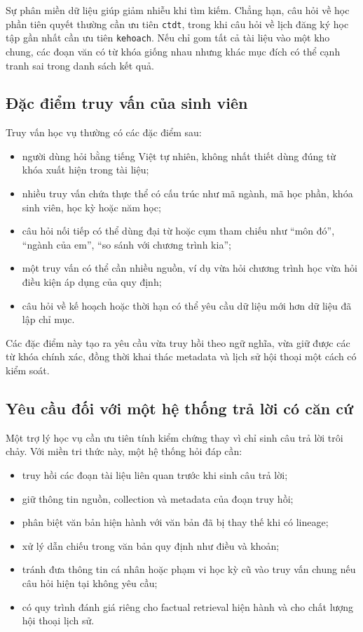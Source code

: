\documentclass[../DoAn.tex]{subfiles}
\begin{document}
Sự phân miền dữ liệu giúp giảm nhiễu khi tìm kiếm. Chẳng hạn, câu hỏi về học phần
tiên quyết thường cần ưu tiên \texttt{ctdt}, trong khi câu hỏi về lịch đăng ký
học tập gần nhất cần ưu tiên \texttt{kehoach}. Nếu chỉ gom tất cả tài liệu vào
một kho chung, các đoạn văn có từ khóa giống nhau nhưng khác mục đích có thể cạnh
tranh sai trong danh sách kết quả.

\subsection{Đặc điểm truy vấn của sinh viên}

Truy vấn học vụ thường có các đặc điểm sau:

\begin{itemize}
    \item người dùng hỏi bằng tiếng Việt tự nhiên, không nhất thiết dùng đúng từ
    khóa xuất hiện trong tài liệu;
    \item nhiều truy vấn chứa thực thể có cấu trúc như mã ngành, mã học phần,
    khóa sinh viên, học kỳ hoặc năm học;
    \item câu hỏi nối tiếp có thể dùng đại từ hoặc cụm tham chiếu như ``môn đó'',
    ``ngành của em'', ``so sánh với chương trình kia'';
    \item một truy vấn có thể cần nhiều nguồn, ví dụ vừa hỏi chương trình học vừa
    hỏi điều kiện áp dụng của quy định;
    \item câu hỏi về kế hoạch hoặc thời hạn có thể yêu cầu dữ liệu mới hơn dữ liệu
    đã lập chỉ mục.
\end{itemize}

Các đặc điểm này tạo ra yêu cầu vừa truy hồi theo ngữ nghĩa, vừa giữ được các từ
khóa chính xác, đồng thời khai thác metadata và lịch sử hội thoại một cách có
kiểm soát.

\subsection{Yêu cầu đối với một hệ thống trả lời có căn cứ}

Một trợ lý học vụ cần ưu tiên tính kiểm chứng thay vì chỉ sinh câu trả lời trôi
chảy. Với miền tri thức này, một hệ thống hỏi đáp cần:

\begin{itemize}
    \item truy hồi các đoạn tài liệu liên quan trước khi sinh câu trả lời;
    \item giữ thông tin nguồn, collection và metadata của đoạn truy hồi;
    \item phân biệt văn bản hiện hành với văn bản đã bị thay thế khi có lineage;
    \item xử lý dẫn chiếu trong văn bản quy định như điều và khoản;
    \item tránh đưa thông tin cá nhân hoặc phạm vi học kỳ cũ vào truy vấn chung
    nếu câu hỏi hiện tại không yêu cầu;
    \item có quy trình đánh giá riêng cho factual retrieval hiện hành và cho chất
    lượng hội thoại lịch sử.
\end{itemize}
\end{document}
